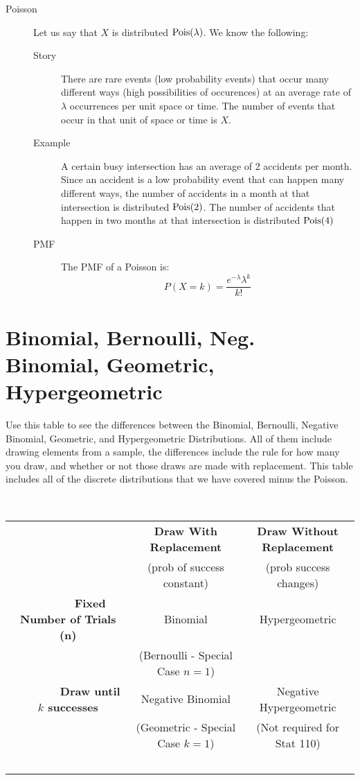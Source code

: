 \documentclass[11pt]{article}
\begin{document}
\begin{description}
\item[Poisson] Let us say that $X$ is distributed $\textrm{Pois}(\lambda)$. We know the following:
\begin{description}
  \item[Story] There are rare events (low probability events) that occur many different ways (high possibilities of occurences) at an average rate of $\lambda$ occurrences per unit space or time. The number of events that occur in that unit of space or time is $X$.

  \item[Example] A certain busy intersection has an average of 2 accidents per month. Since an accident is a low probability event that can happen many different ways, the number of accidents in a month at that intersection is distributed $\textrm{Pois}(2)$. The number of accidents that happen in two months at that intersection is distributed $\textrm{Pois}(4)$

  \item[PMF] The PMF of a Poisson is:
\[P(X = k) = \frac{e^{-\lambda}\lambda^k}{k!}\]
\end{description}
\end{description}


\section*{Binomial, Bernoulli, Neg. Binomial, Geometric, Hypergeometric}
Use this table to see the differences between the Binomial, Bernoulli, Negative Binomial, Geometric, and Hypergeometric Distributions. All of them include drawing elements from a sample, the differences include the rule for how many you draw, and whether or not those draws are made with replacement. This table includes all of the discrete distributions that we have covered minus the Poisson.

\begin{table}[htb!]
    \begin{tabular}{ccc}
  \toprule
  ~ & \textbf{Draw With Replacement} & \textbf{Draw Without Replacement}  \\
        ~ & (prob of success constant) & (prob success changes) \\
  \midrule
        \textbf{Fixed Number of Trials (n)} & Binomial & Hypergeometric \\
        ~ & (Bernoulli - Special Case $n = 1$) & ~ \\
        \textbf{Draw until $k$ successes} & Negative Binomial & Negative Hypergeometric \\
        ~ & (Geometric - Special Case $k = 1$) & (Not required for Stat 110) \\ \bottomrule
    \end{tabular}
\end{table}
\end{document}
